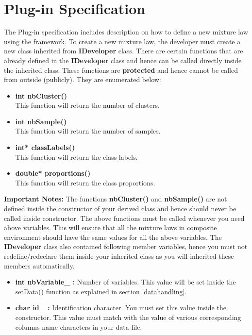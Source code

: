 \documentclass[a4paper,11pt]{article}
\begin{document}
\section{Plug-in Specification}

The Plug-in specification includes description on how to define a new mixture law using the framework.
To create a new mixture law, the developer 
must create a new class inherited from {\bf IDeveloper} class.
There are certain functions that are already defined in the {\bf IDeveloper} 
class and hence can be called directly inside the inherited class. These functions are {\bf protected} and hence cannot be called from outside (publicly). 
They are enumerated below:
\begin{itemize}
 \item {\bf int nbCluster()}\\
This function will return the number of clusters.
 \item {\bf int nbSample()}\\
This function will return the number of samples.
\item {\bf int* classLabels()}\\
This function will return the class labels.
\item {\bf double* proportions()}\\
This function will return the class proportions.
\end{itemize}
{\bf Important Notes:} The functions {\bf nbCluster()} and {\bf nbSample()} are not defined inside the constructor of your derived class and hence should
never be called inside constructor. The above functions must be called whenever you need above variables. This will ensure that all the mixture laws in composite environment should have the same
values for all the above variables.
The {\bf IDeveloper} class also contained following member variables, hence you must not redefine/redeclare them inside your inherited class as you will inherited these members automatically.
\begin{itemize}
\item {\bf int nbVariable\_ : }Number of variables. This value will be set inside the setData() function as explained in section \ref{datahandling}. 
\item {\bf char id\_ : }Identification character. You must set this value inside the constructor. This value must match with the value of various corresponding columns name characters
in your data file.
\end{itemize}
\end{document}
